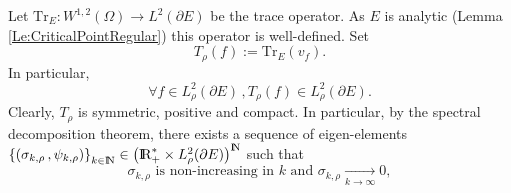 \documentclass{article}
\newcommand{\R}{\textnormal{I\kern-0.21emR}}
\newcommand{\N}{\textnormal{I\kern-0.21emN}}
\renewcommand{\geq}{\geqslant}
\renewcommand{\leq}{\leqslant}
\def\O{{\Omega}}
\def\n{{\nabla}}
\numberwithin{equation}{section}
\begin{document}
Let $\mathrm{Tr}_{E}:W^{1,2}(\O)\to L^2(\partial E)$ be the trace operator. As $E$ is analytic (Lemma \ref{Le:CriticalPointRegular}) this operator is well-defined. Set 
\begin{equation}T_\rho(f):=\mathrm{Tr}_{E}(v_f).\end{equation} 
In particular, \[\forall f \in L^2_\rho(\partial E)\,, T_\rho(f)\in L^2_\rho(\partial E).\]
Clearly, $T_\rho$ is symmetric, positive and compact.
%
In particular, by the spectral decomposition theorem, there exists a sequence of eigen-elements $\left\{\left(\sigma_{k,\rho}\,, \psi_{k,\rho}\right)\right\}_{k\in \N}\in \left(\R_+^*\times L^2_\rho(\partial E)\right)^\N$ such that 
$$\sigma_{k,\rho}\text{ is non-increasing in $k$ and }\sigma_{k,\rho}\underset{k\to \infty}\longrightarrow 0,$$
\end{document}
